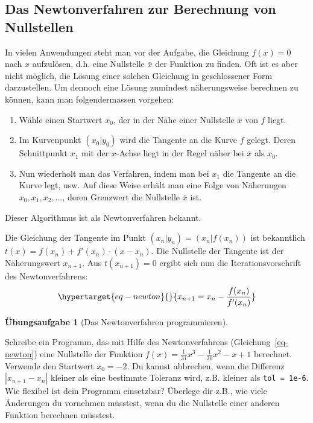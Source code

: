 \documentclass[
  a4paper,
  DIV=11]{scrreprt}
\providecommand{\tightlist}{%
  \setlength{\itemsep}{0pt}\setlength{\parskip}{0pt}}\usepackage{longtable,booktabs,array}
\theoremstyle{definition}
\newtheorem{exercise}{Übungsaufgabe}[chapter]
\theoremstyle{definition}
\theoremstyle{remark}
\begin{document}
\hypertarget{sec-Newtonverfahren1D}{%
\subsection{Das Newtonverfahren zur Berechnung von
Nullstellen}\label{sec-Newtonverfahren1D}}

In vielen Anwendungen steht man vor der Aufgabe, die Gleichung
\(f(x) = 0\) nach \(x\) aufzulösen, d.h. eine Nullstelle \(\bar{x}\) der
Funktion zu finden. Oft ist es aber nicht möglich, die Lösung einer
solchen Gleichung in geschlossener Form darzustellen. Um dennoch eine
Lösung zumindest näherungsweise berechnen zu können, kann man
folgendermassen vorgehen:

\begin{enumerate}
\def\labelenumi{\arabic{enumi}.}
\tightlist
\item
  Wähle einen Startwert \(x_0\), der in der Nähe einer Nullstelle
  \(\bar{x}\) von \(f\) liegt.
\item
  Im Kurvenpunkt \((x_0 | y_0)\) wird die Tangente an die Kurve \(f\)
  gelegt. Deren Schnittpunkt \(x_1\) mit der \(x\)-Achse liegt in der
  Regel näher bei \(\bar{x}\) als \(x_0\).
\item
  Nun wiederholt man das Verfahren, indem man bei \(x_1\) die Tangente
  an die Kurve legt, usw. Auf diese Weise erhält man eine Folge von
  Näherungen \(x_0, x_1, x_2, \ldots\), deren Grenzwert die Nullstelle
  \(\bar{x}\) ist.
\end{enumerate}

Dieser Algorithmus ist als Newtonverfahren bekannt.

Die Gleichung der Tangente im Punkt \((x_n | y_n) = (x_n | f(x_n))\) ist
bekanntlich \(t(x) = f(x_n) + f'(x_n) \cdot (x - x_n)\). Die Nullstelle
der Tangente ist der Näherungswert \(x_{n+1}\). Aus \(t(x_{n+1}) = 0\)
ergibt sich nun die Iterationsvorschrift des Newtonverfahrens:
\begin{equation}\protect\hypertarget{eq-newton}{}{
x_{n+1} = x_n - \frac{f(x_n)}{f'(x_n)}
}\label{eq-newton}\end{equation}

\begin{exercise}[Das Newtonverfahren
programmieren]\protect\hypertarget{exr-NewtonFirstTry}{}\label{exr-NewtonFirstTry}

Schreibe ein Programm, das mit Hilfe des Newtonverfahrens
(Gleichung~\ref{eq-newton}) eine Nullstelle der Funktion
\(f(x) = \frac{1}{31} x^3 -\frac{1}{20} x^2 -x + 1\) berechnet. Verwende
den Startwert \(x_0 = -2\). Du kannst abbrechen, wenn die Differenz
\(|x_{n+1} - x_n|\) kleiner als eine bestimmte Toleranz wird, z.B.
kleiner als \texttt{tol\ =\ 1e-6}. Wie flexibel ist dein Programm
einsetzbar? Überlege dir z.B., wie viele Änderungen du vornehmen
müsstest, wenn du die Nullstelle einer anderen Funktion berechnen
müsstest.

\end{exercise}
\end{document}
